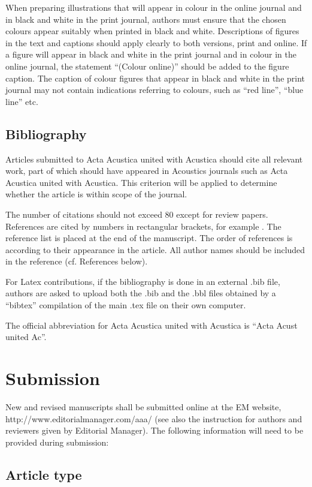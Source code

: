 \documentclass[twocolumn]{article}
\begin{document}
When preparing illustrations that will appear in colour in the online
journal and in black and white in the print journal, authors must ensure
that the chosen colours appear suitably when printed in black and white.
Descriptions of figures in the text and captions should apply clearly to
both versions, print and online. If a figure will appear in black and
white in the print journal and in colour in the online journal, the
statement ``(Colour online)'' should be added to the figure caption. The
caption of colour figures that appear in black and white in the print
journal may not contain indications referring to colours, such as ``red
line'', ``blue line'' etc.

\subsection{Bibliography}

Articles submitted to Acta Acustica united with Acustica should cite
all relevant work, part of which should have appeared in Acoustics
journals such as Acta Acustica united with Acustica. This criterion
will be applied to determine whether the article is within scope of
the journal.

The number of citations should not exceed 80 except for review papers.
References are cited by numbers in rectangular brackets, for example
\cite{3,4}. The reference list is placed at the end of the manuscript.
The order of references is according to their appearance in the article.
All author names should be included in the reference (cf. References
below).

For Latex contributions, if the bibliography is done in an external
.bib file, authors are asked to upload both the .bib and the .bbl
files obtained by a ``bibtex'' compilation of the main .tex file
on their own computer.

The official abbreviation for Acta Acustica united with
Acustica is ``Acta Acust united Ac''.


\section{Submission}

New and revised manuscripts shall be submitted online at the EM website,
http://www.editorialmanager.com/aaa/ (see also the instruction for
authors and reviewers given by Editorial Manager). The following
information will need to be provided during submission:

\subsection{Article type}
\end{document}
